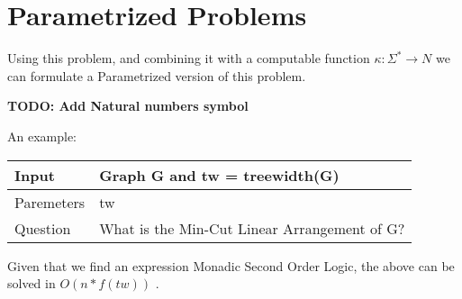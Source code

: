 \section{Parametrized Problems}

Using this problem, and combining it with a computable function $ \kappa : \Sigma^* \rightarrow N $ we can formulate a Parametrized version of this problem. 

\textbf{TODO: Add Natural numbers symbol}

An example:

\begin{center}
    \begin{tabular}{| l | p{5cm} |}
    \hline
    Input & Graph G and tw = treewidth(G)\\ \hline
    Paremeters & tw  \\ \hline
    Question & What is the Min-Cut Linear Arrangement of G?\\ \hline
    \end{tabular}
\end{center}

Given that we find an expression Monadic Second Order Logic, the above can be solved in $O(n*f(tw))$ \cite{trans}. 


